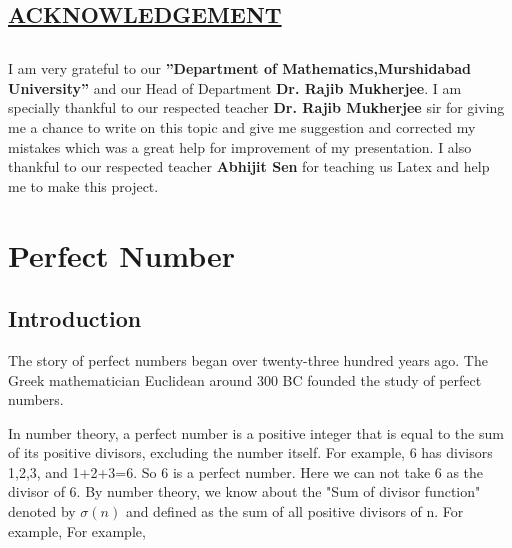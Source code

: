 \documentclass[12pt,,a4paper]{article}
\begin{document}
\newpage



\begin{center}
    
\section*{\color{blue}\underline {ACKNOWLEDGEMENT}}
\end{center}
\thispagestyle{empty}
\section*{}
I am very grateful to our \textbf{”Department of Mathematics,Murshidabad
University”} and our Head of Department \textbf{Dr. Rajib Mukherjee}.
I am specially thankful to our respected teacher \textbf{Dr. Rajib Mukherjee} sir for
giving me a chance to write on this topic and give me suggestion and
corrected my mistakes which was a great help for improvement of my
presentation.
I also thankful to our respected teacher \textbf{Abhijit Sen} for teaching us Latex
and help me to make this project.
\newpage

\tableofcontents
\clearpage


 \fontsize{14pt}{10pt}\selectfont

 
\chapter*{Perfect Number}
\section{Introduction}
The story of perfect numbers began over twenty-three hundred years ago. The Greek mathematician Euclidean around 300 BC founded the study of perfect numbers.\par
	In number theory, a perfect number is a  positive integer that is equal to the sum of its positive divisors, excluding the number itself. For example, 6 has divisors 1,2,3, and 1+2+3=6. So 6 is a perfect number. Here we can not take 6 as the divisor of 6. By number theory, we know about the "Sum of divisor function" denoted by   $\sigma(n)$   and defined as the sum of all positive divisors of n. For example,  For example,  
\end{document}
